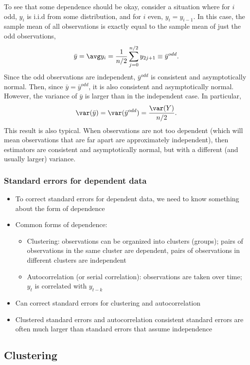 To see that some dependence should be okay, consider a situation where
for $i$ odd, $y_i$ is i.i.d from some distribution, and for $i$ even,
$y_i = y_{i-1}$. In this case, the sample mean of all observations is
exactly equal to the sample mean of just the odd observations,
\[ \bar{y} = \avg y_i = \frac{1}{n/2} \sum_{j=0}^{n/2} y_{2j+1} \equiv
\bar{y}^{odd}. \]
Since the odd observations are independent, $\bar{y}^{odd}$ is
consistent and asymptotically normal. Then, since $\bar{y} =
\bar{y}^{odd}$, it is also consistent and asymptotically
normal. However, the variance of $\bar{y}$ is larger than in the
independent case. In particular, 
\[ \var(\bar{y}) = \var(\bar{y}^{odd}) = \frac{\var(Y)}{n/2}. \]
This result is also typical. When observations are not too dependent
(which will mean observations that are far apart are approximately
independent), then estimators are consistent and asymptotically
normal, but with a different (and usually larger) variance. 

\begin{frame}[allowframebreaks]
  \frametitle{Standard errors for dependent data}
  \begin{itemize}
  \item To correct standard errors for dependent data, we need to know
    something about the form of dependence
  \item Common forms of dependence:
    \begin{itemize}
    \item \alert{Clustering}: observations can be organized into clusters
      (groups); pairs of observations in the same cluster are
      dependent, pairs of observations in different clusters are
      independent 
    \item \alert{Autocorrelation} (or serial correlation):
      observations are taken over time; $y_t$ is correlated with
      $y_{t-k}$
    \end{itemize} 
  \item Can correct standard errors for clustering and autocorrelation 
  \item Clustered standard errors and autocorrelation consistent
    standard errors are often much larger than standard errors that
    assume independence 
  \end{itemize}  
\end{frame}

\subsection{Clustering}

